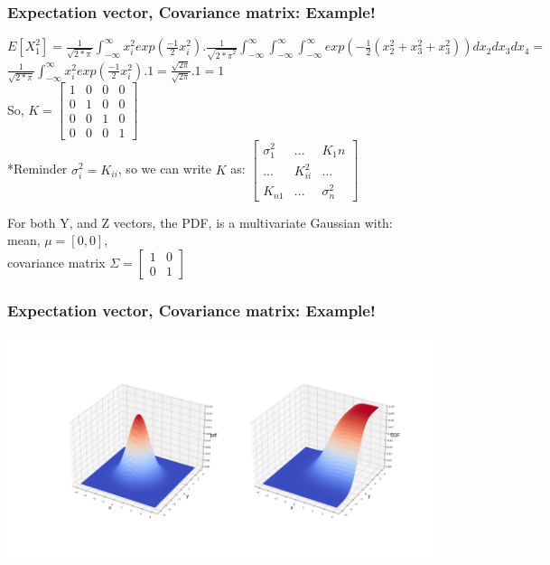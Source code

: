 \documentclass{beamer}
\begin{document}
\begin{frame}
\frametitle{Expectation vector, Covariance matrix: Example!}
$E[X_1^2] = \frac{1}{\sqrt{2*\pi}}\int_{-\infty}^{\infty} x_i^2exp(\frac{-1}{2}x_i^2).\frac{1}{\sqrt{{2*\pi}^2}}\int_{-\infty}^{\infty}\int_{-\infty}^{\infty}\int_{-\infty}^{\infty} exp(-\frac{1}{2}(x_2^2+x_3^2 +x_3^2)) dx_2dx_3dx_4 =$\newline\\
$\frac{1}{\sqrt{2*\pi}}\int_{-\infty}^{\infty} x_i^2exp(\frac{-1}{2}x_i^2).1 = \frac{\sqrt{2\pi}}{\sqrt{2\pi}}.1=1$\newline\\
So, $K =\begin{bmatrix}
   1&0&0&0 \\
   0&1&0&0\\
    0&0&1&0\\
    0&0&0&1
\end{bmatrix}$\newline\\

*Reminder
$\sigma_i^2=K_{ii}$, so we can write $K$ as:
$\begin{bmatrix}
   \sigma_1^2& ...&K_1n \\
    ...&K_{ii}^2&...\\
    K_{n1}&...&\sigma_n^2
\end{bmatrix}$\newline\\
\end{frame}

\begin{frame}
For both Y, and Z vectors, the PDF, is a multivariate Gaussian with:
\\mean, $\mu = [0,0]$,\\
covariance matrix $\Sigma = \begin{bmatrix}
    1 & 0 \\
    0&1
\end{bmatrix}$\newline\\
\frametitle{Expectation vector, Covariance matrix: Example!}
\includegraphics[height=6.5cm]{2D-1.png}
\end{frame}
\end{document}

